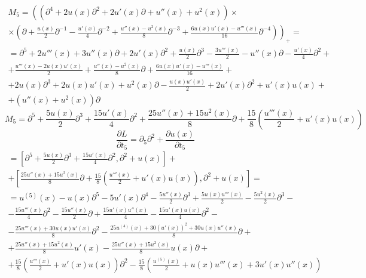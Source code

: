 \documentclass[12pt]{article}
\theoremstyle{definition}
\begin{document}
\begin{enumerate}
\begin{itemize}
\begin{multline}
            M_5=\left((\partial^4+2u(x)\partial^2+2u'(x)\partial+u''(x)+u^2(x))\times\right.\\\left.\times\left(\partial+\frac{u(x)}{2}\partial^{-1}-\frac{u'(x)}{4}\partial^{-2}+\frac{u''(x)-u^2(x)}{8}\partial^{-3}+\frac{6u(x)u'(x)-u'''(x)}{16}\partial^{-4}\right)\right)_+=\\=\partial^5+2u'''(x)+3u''(x)\partial+2u'(x)\partial^2+\frac{u(x)}{2}\partial^3-\frac{3u'''(x)}{2}-u''(x)\partial-\frac{u'(x)}{4}\partial^2+\\+\frac{u'''(x)-2u(x)u'(x)}{2}+\frac{u''(x)-u^2(x)}{8}\partial+\frac{6u(x)u'(x)-u'''(x)}{16}+\\+2u(x)\partial^3+2u(x)u'(x)+u^2(x)\partial-\frac{u(x)u'(x)}{2}+2u'(x)\partial^2+u'(x)u(x)+\\+(u''(x)+u^2(x))\partial
        \end{multline}
        \begin{equation*}
            \boxed{M_5=\partial^5+\frac{5u(x)}{2}\partial^3+\frac{15u'(x)}{4}\partial^2+\frac{25u''(x)+15u^2(x)}{8}\partial+\frac{15}{8}\left(\frac{u'''(x)}{2}+u'(x)u(x)\right)}
        \end{equation*}
        \begin{equation}
            \frac{\partial L}{\partial t_5}=\partial_5\partial^2+\frac{\partial u(x)}{\partial t_5}
        \end{equation}
        \begin{multline*}
            [M_5,L]=\left[\partial^5+\frac{5u(x)}{2}\partial^3+\frac{15u'(x)}{4}\partial^2,\partial^2+u(x)\right]+\\+\left[\frac{25u''(x)+15u^2(x)}{8}\partial+\frac{15}{8}\left(\frac{u'''(x)}{2}+u'(x)u(x)\right),\partial^2+u(x)\right]=\\=u^{(5)}(x)-u(x)\partial^5-5u'(x)\partial^4-\frac{5u''(x)}{2}\partial^3+\frac{5u(x)u'''(x)}{2}-\frac{5u^2(x)}{2}\partial^3-\\-\frac{15u'''(x)}{4}\partial^2-\frac{15u''(x)}{2}\partial+\frac{15u'(x)u''(x)}{4}-\frac{15u'(x)u(x)}{4}\partial^2-\\-\frac{25u'''(x)+30u(x)u'(x)}{8}\partial^2-\frac{25u^{(4)}(x)+30(u'(x))^2+30u(x)u''(x)}{8}\partial+\\+\frac{25u''(x)+15u^2(x)}{8}u'(x)-\frac{25u''(x)+15u^2(x)}{8}u(x)\partial+\\+\frac{15}{8}\left(\frac{u'''(x)}{2}+u'(x)u(x)\right)\partial^2-\frac{15}{8}\left(\frac{u^{(5)}(x)}{2}+u(x)u'''(x)+3u'(x)u''(x)\right)
        \end{multline*}
        \begin{equation}

\end{equation}
\end{itemize}
\end{enumerate}
\end{document}
